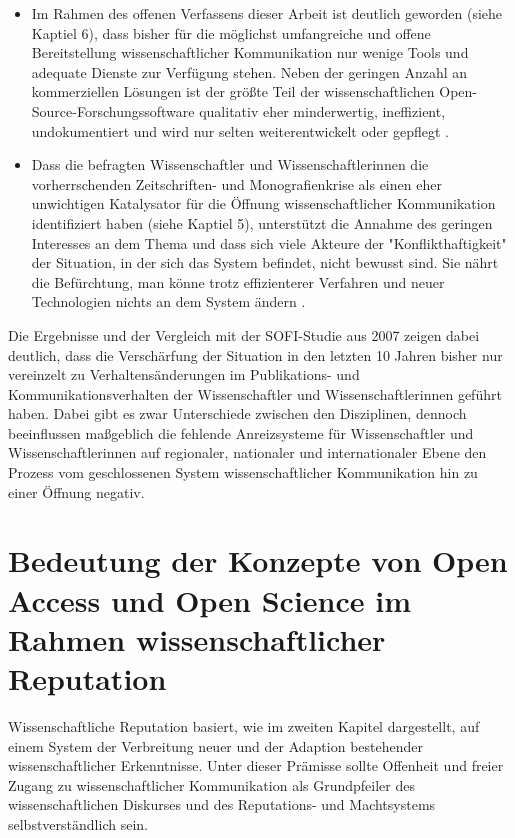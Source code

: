 \begin{itemize}
\item Im Rahmen des offenen Verfassens dieser Arbeit ist deutlich geworden (siehe Kaptiel 6), dass bisher für die möglichst umfangreiche und offene Bereitstellung wissenschaftlicher Kommunikation nur wenige Tools und adequate Dienste zur Verfügung stehen. Neben der geringen Anzahl an kommerziellen Lösungen ist der größte Teil der wissenschaftlichen Open-Source-Forschungssoftware qualitativ eher minderwertig, ineffizient, undokumentiert und wird nur selten weiterentwickelt oder gepflegt \cite{Hey_2015}.
\item Dass die befragten Wissenschaftler und Wissenschaftlerinnen die vorherrschenden Zeitschriften- und Monografienkrise als einen eher unwichtigen Katalysator für die Öffnung wissenschaftlicher Kommunikation identifiziert haben (siehe Kaptiel 5), unterstützt die Annahme des geringen Interesses an dem Thema und dass sich viele Akteure der "Konflikthaftigkeit" \cite{Kaldewey_2010} der Situation, in der sich das System befindet, nicht bewusst sind. Sie nährt die Befürchtung, man könne trotz effizienterer Verfahren und neuer Technologien nichts an dem System ändern \cite{Parks_2002}.
\end{itemize}

Die Ergebnisse und der Vergleich mit der SOFI-Studie aus 2007 zeigen dabei deutlich, dass die Verschärfung der Situation in den letzten 10 Jahren bisher nur vereinzelt zu Verhaltensänderungen im Publikations- und Kommunikationsverhalten der Wissenschaftler und Wissenschaftlerinnen geführt haben. Dabei gibt es zwar Unterschiede zwischen den Disziplinen, dennoch beeinflussen maßgeblich die fehlende Anreizsysteme für Wissenschaftler und Wissenschaftlerinnen auf regionaler, nationaler und internationaler Ebene den Prozess vom geschlossenen System wissenschaftlicher Kommunikation hin zu einer Öffnung negativ.

\section{Bedeutung der Konzepte von Open Access und Open Science im Rahmen wissenschaftlicher Reputation}

Wissenschaftliche Reputation basiert, wie im zweiten Kapitel dargestellt, auf einem System der Verbreitung neuer und der Adaption bestehender wissenschaftlicher Erkenntnisse. Unter dieser Prämisse sollte Offenheit und freier Zugang zu wissenschaftlicher Kommunikation als Grundpfeiler des wissenschaftlichen Diskurses und des Reputations- und Machtsystems selbstverständlich sein.

